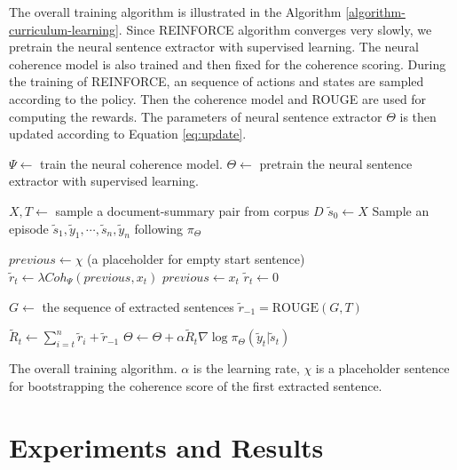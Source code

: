 \documentclass[letterpaper]{article} %
\begin{document}
	The overall training algorithm is illustrated in the Algorithm \ref{algorithm-curriculum-learning}. Since REINFORCE algorithm converges very slowly, we pretrain the neural sentence extractor with supervised learning. The neural coherence model is also trained and then fixed for the coherence scoring. During the training of REINFORCE, an sequence of actions and states are sampled
	according to the policy. Then the coherence model and ROUGE are used for computing the rewards. The parameters of neural sentence extractor $\Theta$ is then updated according to Equation \ref{eq:update}. 
	
	\begin{algorithm}[t]
		\small
		\begin{algorithmic}[1]
			\State $\Psi \leftarrow$ train the neural coherence model.
			\State $\Theta \leftarrow$ pretrain the neural sentence extractor with supervised learning.

			\Loop
			
			\State $X, T \leftarrow$ sample a document-summary pair from corpus $D$
			\State $\tilde{s}_0 \leftarrow X$
			\State Sample an episode $\tilde{s}_1, \tilde{y}_1, \cdots, \tilde{s}_n, \tilde{y}_n$ following $\pi_{\Theta}$
			
			\State $previous \leftarrow \chi$ (a placeholder for empty start sentence)
				\State $\tilde{r}_t \leftarrow \lambda Coh_{\Psi}(previous, x_t)$
				\State $previous \leftarrow x_t$
			\Else
				\State $\tilde{r}_t \leftarrow 0 $
			\EndIf
			\EndFor
			
			
			\State $G \leftarrow$ the sequence of extracted sentences
			\State $\tilde{r}_{-1} = \text{ROUGE}(G, T)$
			
			\State $\tilde{R}_t \leftarrow \sum_{i=t}^{n} \tilde{r}_i + \tilde{r}_{-1}$
			\State $\Theta \leftarrow \Theta + \alpha \tilde{R}_t \nabla \log \pi_{\Theta}(\tilde{y}_t|\tilde{s}_t)$
			\EndFor
			
			\EndLoop
			
		\end{algorithmic}
		\caption{The overall training algorithm. $\alpha$ is the learning rate, $\chi$ is a placeholder sentence for bootstrapping the coherence score of the first extracted sentence.}
		\label{algorithm-curriculum-learning}
	\end{algorithm}
	\vspace{-4pt}

	
	\section{Experiments and Results}
\end{document}
